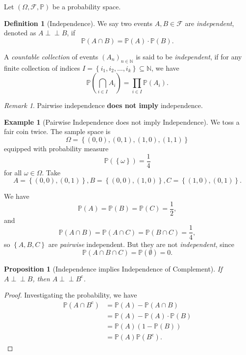 \documentclass[11pt]{article}
\numberwithin{equation}{section}
\newtheorem{proposition}[theorem]{Proposition}
\theoremstyle{definition}
\newtheorem{definition}[theorem]{Definition}
\newtheorem{example}[theorem]{Example}
\theoremstyle{remark}
\newtheorem{remark}[theorem]{Remark}
\newcommand{\pqty}[1]{\left(#1\right)}
\newcommand{\Bqty}[1]{\left\{#1\right\}}
\newcommand{\NN}{\mathbb N}
\newcommand{\compl}{^{\mathrm c}}
\newcommand{\eventSpace}{\mathcal F}
\newcommand{\Prob}{\mathbb P}
\newcommand{\indp}{\mathrel{\perp\!\!\!\perp}}
\begin{document}
Let \(\pqty{\Omega, \eventSpace, \Prob}\) be a probability space.

\begin{definition}[Independence]\label{probability-definition-008}
    \label{probability-def:independence}%
    We say two events \(A, B \in \eventSpace\) are \emph{independent}, denoted as \(A \indp B\), if
    \[
        \Prob\pqty{A \cap B} = \Prob\pqty{A} \cdot \Prob\pqty{B}.
    \]

    A \emph{countable collection} of events \(\pqty{A_n}_{n \in \NN}\) is said to be \emph{independent}, if for any finite collection of indices \(I = \Bqty{i_1, i_2, \ldots, i_k} \subseteq \NN\), we have
    \[
        \Prob\pqty{\bigcap_{i \in I} A_i} = \prod_{i \in I} \Prob\pqty{A_i}.
    \]
\end{definition}

\begin{remark}\label{probability-remark-004}
    Pairwise independence \textbf{does not imply} independence.
\end{remark}

\begin{example}[Pairwise Independence does not imply Independence]\label{probability-example-009}
    \label{probability-ex:pairwise-indep-does-not-imply-indep}
    We toss a fair coin twice. The sample space is
    \[
        \Omega = \Bqty{\pqty{0, 0}, \pqty{0, 1}, \pqty{1, 0}, \pqty{1, 1}}
    \]
    equipped with probability measure
    \[
        \Prob\pqty{\Bqty{\omega}} = \frac{1}{4}
    \]  
    for all \(\omega \in \Omega\). Take
    \[
        A = \Bqty{\pqty{0, 0}, \pqty{0, 1}}, B = \Bqty{\pqty{0, 0}, \pqty{1, 0}}, C = \Bqty{\pqty{1, 0}, \pqty{0, 1}}.
    \]

    We have
    \[
        \Prob\pqty{A} = \Prob\pqty{B} = \Prob\pqty{C} = \frac{1}{2},
    \]
    and
    \[
        \Prob\pqty{A \cap B} = \Prob\pqty{A \cap C} = \Prob\pqty{B \cap C} = \frac{1}{4},
    \]
    so \(\Bqty{A, B, C}\) are \emph{pairwise} independent. But they are not \emph{independent}, since
    \[
        \Prob\pqty{A \cap B \cap C} = \Prob\pqty{\emptyset} = 0.
    \]
\end{example}

\begin{proposition}[Independence implies Independence of Complement]\label{probability-proposition-005}
    \label{probability-prop:indep-compl}%
    If \(A \indp B\), then \(A \indp B\compl\).
\end{proposition}

\begin{proof}\label{probability-proof-013}
    Investigating the probability, we have
    \begin{align*}
        \Prob\pqty{A \cap B\compl} &= \Prob\pqty{A} - \Prob\pqty{A \cap B} \\
        &= \Prob\pqty{A} - \Prob\pqty{A} \cdot \Prob\pqty{B} \\
        &= \Prob\pqty{A} \pqty{1 - \Prob\pqty{B}} \\
        &= \Prob\pqty{A} \Prob\pqty{B\compl}.
    \end{align*}
\end{proof}
\end{document}
